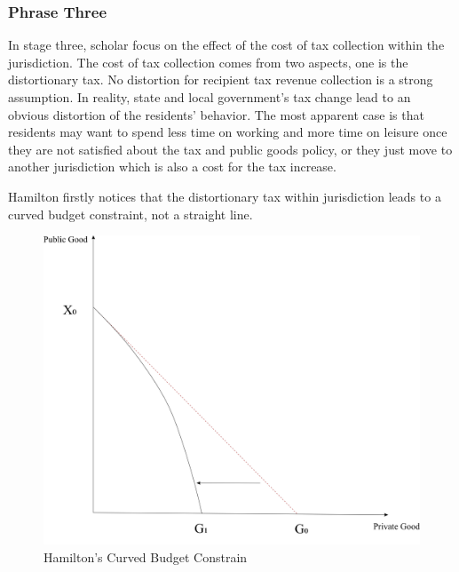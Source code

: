 \subsubsection{Phrase Three}

In stage three, scholar focus on the effect of the cost of tax collection within the jurisdiction. The cost of tax collection comes from two aspects, one is the distortionary tax. No distortion for recipient tax revenue collection is a strong assumption. In reality, state and local government’s tax change lead to an obvious distortion of the residents’ behavior. The most apparent case is that residents may want to spend less time on working and more time on leisure once they are not satisfied about the tax and public goods policy, or they just move to another jurisdiction which is also a cost for the tax increase.

Hamilton \cite{hamilton1986flypaper} firstly notices that the distortionary tax within jurisdiction leads to a curved budget constraint, not a straight line.

\begin{figure}[H]
    \centering
    \includegraphics[scale=0.4]{Chapter-3/Figures/budget constrain distortion.jpg}
    \caption[Hamilton's Curved Budget Constraint]{Hamilton's Curved Budget Constrain
        \texttt{} }
    \label{Figure 3.4}
\end{figure}

